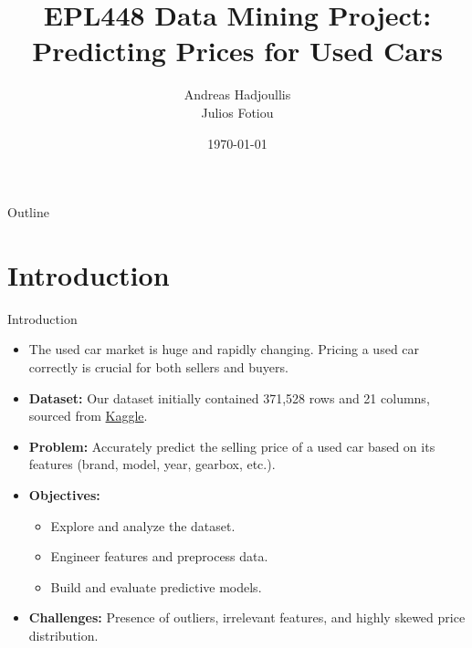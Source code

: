 \documentclass{beamer}
\title[]{EPL448 Data Mining Project: Predicting Prices for Used Cars}
\author[]{Andreas Hadjoullis\\Julios Fotiou}
\institute[]{Department of Computer Science \\ University of Cyprus}
\date[]{\today}
\begin{document}
\begin{frame}
        \titlepage
\end{frame}

\begin{frame}{Outline}
        \tableofcontents
\end{frame}

\section{Introduction}
\begin{frame}{Introduction}
        \begin{itemize}
                \item The used car market is huge and rapidly changing. Pricing
                        a used car correctly is crucial for both sellers and
                        buyers.
                \item \textbf{Dataset:} Our dataset initially contained 371,528
                        rows and 21 columns, sourced from \href{https://www.kaggle.com/datasets/thedevastator/uncovering-factors-that-affect-used-car-prices/data}{Kaggle}.
                \item \textbf{Problem:} Accurately predict the selling price of
                        a used car based on its features (brand, model, year,
                        gearbox, etc.).
                \item \textbf{Objectives:}
                        \begin{itemize}
                                \item Explore and analyze the dataset.
                                \item Engineer features and preprocess data.
                                \item Build and evaluate predictive models.
                        \end{itemize}
                \item \textbf{Challenges:} Presence of outliers, irrelevant
                        features, and highly skewed price distribution.
        \end{itemize}
\end{frame}

\end{document}
